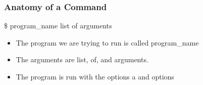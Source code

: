 \documentclass{beamer}
\theoremstyle{definition}
\begin{document}
\begin{frame}
  \frametitle{\huge Anatomy of a Command}
\pause
  \large
\begin{center}
\$ \pause program\_name  \pause list of arguments
  \end{center}

\begin{itemize}
  \item The program we are trying to run is called program\_name
  \item The arguments are list, of, and arguments.
  \item The program is run with the options a and options
\end{itemize}

 \end{frame}
\end{document}
